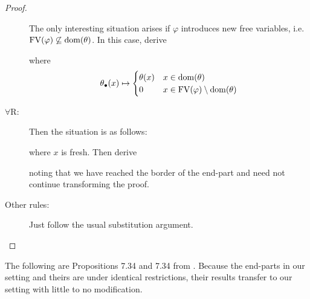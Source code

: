 \begin{proof}
\begin{description}
\begin{comfproof}
    \end{comfproof}
    The only interesting situation arises if $\varphi$ introduces new free
    variables, i.e.\ $\mathrm{FV}(\varphi) \not\subseteq
    \mathrm{dom}(\theta)$. In this case, derive
    \begin{comfproof}
    \end{comfproof}
    where
    \[
      \theta_\bullet(x) \mapsto
      \begin{cases}
        \theta(x) & x \in \mathrm{dom}(\theta) \\
        0 & x \in \mathrm{FV}(\varphi) \setminus \mathrm{dom}(\theta)
      \end{cases}
    \]
  \item[$\forall$R:] Then the situation is as follows:
    \begin{comfproof}
    \end{comfproof}
    where $x$ is fresh. Then derive
    \begin{comfproof}
    \end{comfproof}
    noting that we have reached the border of the end-part and need not continue
    transforming the proof.
  \item[Other rules:] Just follow the usual substitution argument.
  \end{description}
\end{proof}

The following are Propositions 7.34 and 7.34 from \parencite{mancosuIntroductionProofTheory2021}.
Because the end-parts in our setting and theirs are under identical
restrictions, their results transfer to our setting with little to no modification.

